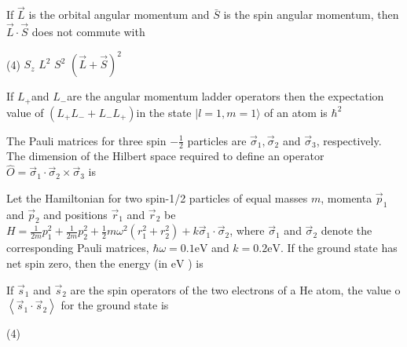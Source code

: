 \begin{enumerate}
\begin{minipage}{\textwidth}
\end{minipage}
\begin{minipage}{\textwidth}
	\item If $\vec{L}$ is the orbital angular momentum and $\bar{S}$ is the spin angular momentum, then $\vec{L} \cdot \vec{S}$ does not commute with
\end{minipage}
\begin{tasks}(4)
	\task[\textbf{A.}] $S_{z}$ 
	\task[\textbf{B.}]$L^{2}$
	\task[\textbf{C.}]$S^{2}$
	\task[\textbf{D.}]$(\vec{L}+\vec{S})^{2}$
\end{tasks}
\begin{minipage}{\textwidth}
	\item If $L_{+}$and $L_{-}$are the angular momentum ladder operators then the expectation value of $\left(L_{+} L_{-}+L_{-} L_{+}\right)$in the state $|l=1, m=1\rangle$ of an atom is $\hbar^{2}$
\end{minipage}
\begin{minipage}{\textwidth}
	\item The Pauli matrices for three spin $-\frac{1}{2}$ particles are $\vec{\sigma}_{1}, \vec{\sigma}_{2}$ and $\vec{\sigma}_{3}$, respectively. The dimension of the Hilbert space required to define an operator $\hat{O}=\vec{\sigma}_{1} \cdot \vec{\sigma}_{2} \times \vec{\sigma}_{3}$ is
\end{minipage}
\begin{minipage}{\textwidth}
	\item Let the Hamiltonian for two spin-1/2 particles of equal masses $m$, momenta $\vec{p}_{1}$ and $\vec{p}_{2}$ and positions $\vec{r}_{1}$ and $\vec{r}_{2}$ be $H=\frac{1}{2 m} p_{1}^{2}+\frac{1}{2 m} p_{2}^{2}+\frac{1}{2} m \omega^{2}\left(r_{1}^{2}+r_{2}^{2}\right)+k \vec{\sigma}_{1} \cdot \vec{\sigma}_{2}$, where $\vec{\sigma}_{1}$ and $\vec{\sigma}_{2}$ denote the corresponding Pauli matrices, $\hbar \omega=0.1 \mathrm{eV}$ and $k=0.2 \mathrm{eV}$. If the ground state has net spin zero, then the energy (in $\mathrm{eV}$ ) is
\end{minipage}
\begin{minipage}{\textwidth}
	\item If $\vec{s}_{1}$ and $\vec{s}_{2}$ are the spin operators of the two electrons of a He atom, the value o $\left\langle\vec{s}_{1} \cdot \vec{s}_{2}\right\rangle$ for the ground state is
\end{minipage}
\begin{tasks}(4)

\end{tasks}
\end{enumerate}
